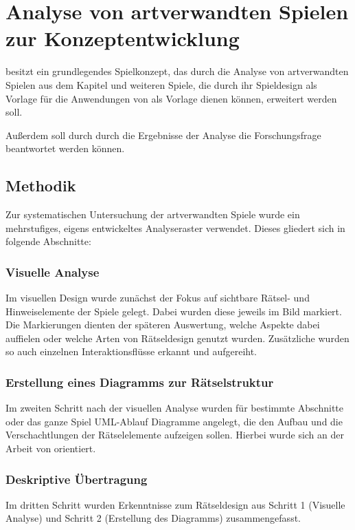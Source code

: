 \chapter{Analyse von artverwandten Spielen zur Konzeptentwicklung}\label{sec:analysis}
 besitzt ein grundlegendes Spielkonzept, das durch die Analyse von artverwandten Spielen aus dem Kapitel \emph{} und weiteren Spiele, die durch ihr Spieldesign als Vorlage für die Anwendungen von  als Vorlage dienen können, erweitert werden soll.

Außerdem soll durch durch die Ergebnisse der Analyse die Forschungsfrage \emph{} beantwortet werden können.

\section{Methodik}
Zur systematischen Untersuchung der artverwandten Spiele wurde ein mehrstufiges, eigens entwickeltes Analyseraster verwendet. Dieses gliedert sich in folgende Abschnitte:

\subsection{Visuelle Analyse}
Im visuellen Design wurde zunächst der Fokus auf sichtbare Rätsel- und Hinweiselemente der Spiele gelegt. Dabei wurden diese jeweils im Bild markiert. Die Markierungen dienten der späteren Auswertung, welche Aspekte dabei auffielen oder welche Arten von Rätseldesign genutzt wurden. Zusätzliche wurden so auch einzelnen Interaktionsflüsse erkannt und aufgereiht.

\subsection{Erstellung eines Diagramms zur Rätselstruktur}
Im zweiten Schritt nach der visuellen Analyse wurden für bestimmte Abschnitte oder das ganze Spiel UML-Ablauf Diagramme angelegt, die den Aufbau und die Verschachtlungen der Rätselelemente aufzeigen sollen. Hierbei wurde sich an der Arbeit von \cite{tim_schafer_grim_1996} orientiert.

\subsection{Deskriptive Übertragung}
Im dritten Schritt wurden Erkenntnisse zum Rätseldesign aus Schritt 1 (Visuelle Analyse) und Schritt 2 (Erstellung des Diagramms) zusammengefasst.

